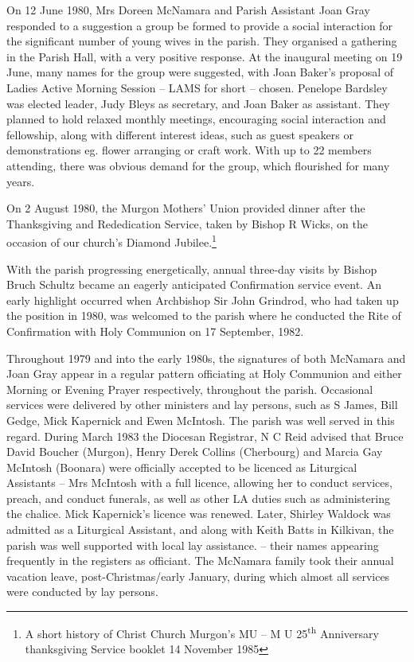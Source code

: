 On 12 June 1980, Mrs Doreen McNamara and Parish Assistant Joan Gray responded to a suggestion a group be formed to provide a social interaction for the significant number of young wives in the parish. They organised a gathering in the Parish Hall, with a very positive response. At the inaugural meeting on 19 June, many names for the group were suggested, with Joan Baker's proposal of Ladies Active Morning Session -- LAMS for short -- chosen. Penelope Bardsley was elected leader, Judy Bleys as secretary, and Joan Baker as assistant. They planned to hold relaxed monthly meetings, encouraging social interaction and fellowship, along with different interest ideas, such as guest speakers or demonstrations eg. flower arranging or craft work. With up to 22 members attending, there was obvious demand for the group, which flourished for many years.

On 2 August 1980, the Murgon Mothers' Union provided dinner after the Thanksgiving and Rededication Service, taken by Bishop R Wicks, on the occasion of our church's Diamond Jubilee.\footnote{A short history of Christ Church Murgon's MU -- M U 25\textsuperscript{th} Anniversary thanksgiving Service booklet 14 November 1985}

With the parish progressing energetically, annual three-day visits by Bishop Bruch Schultz became an eagerly anticipated Confirmation service event. An early highlight occurred when Archbishop Sir John Grindrod, who had taken up the position in 1980, was welcomed to the parish where he conducted the Rite of Confirmation with Holy Communion on 17 September, 1982.

Throughout 1979 and into the early 1980s, the signatures of both McNamara and Joan Gray appear in a regular pattern officiating at Holy Communion and either Morning or Evening Prayer respectively, throughout the parish. Occasional services were delivered by other ministers and lay persons, such as S James, Bill Gedge, Mick Kapernick and Ewen McIntosh. The parish was well served in this regard. During March 1983 the Diocesan Registrar, N C Reid advised that Bruce David Boucher (Murgon), Henry Derek Collins (Cherbourg) and Marcia Gay McIntosh (Boonara) were officially accepted to be licenced as Liturgical Assistants -- Mrs McIntosh with a full licence, allowing her to conduct services, preach, and conduct funerals, as well as other LA duties such as administering the chalice. Mick Kapernick's licence was renewed. Later, Shirley Waldock was admitted as a Liturgical Assistant, and along with Keith Batts in Kilkivan, the parish was well supported with local lay assistance. -- their names appearing frequently in the registers as officiant. The McNamara family took their annual vacation leave, post-Christmas/early January, during which almost all services were conducted by lay persons.

